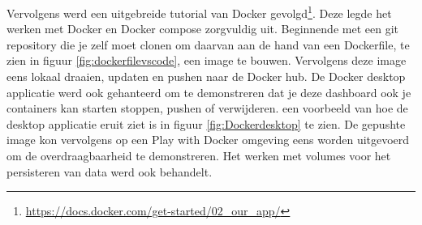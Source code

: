 Vervolgens werd een uitgebreide tutorial van Docker gevolgd\footnote{\url{https://docs.docker.com/get-started/02_our_app/}}. Deze legde het werken met Docker en Docker compose zorgvuldig uit. Beginnende met een git repository die je zelf moet clonen om daarvan aan de hand van een Dockerfile, te zien in figuur \ref{fig:dockerfilevscode}, een image te bouwen. Vervolgens deze image eens lokaal draaien, updaten en pushen naar de Docker hub. De Docker desktop applicatie werd ook gehanteerd om te demonstreren dat je deze dashboard ook je containers kan starten stoppen, pushen of verwijderen. een voorbeeld van hoe de desktop applicatie eruit ziet is in figuur \ref{fig:Dockerdesktop} te zien. De gepushte image kon vervolgens op een Play with Docker omgeving eens worden uitgevoerd om de overdraagbaarheid te demonstreren. Het werken met volumes voor het persisteren van data werd ook behandelt. 

